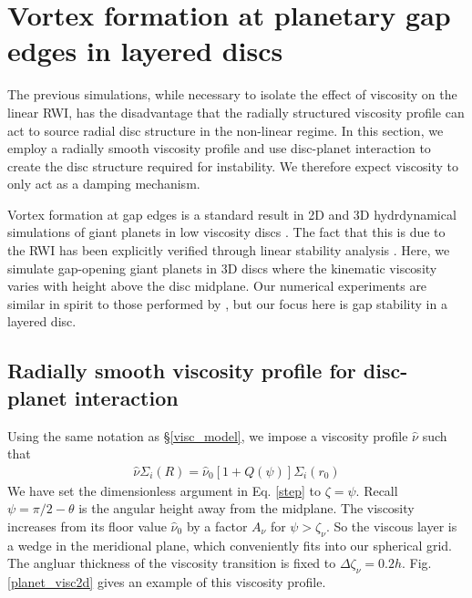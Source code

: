 \section{Vortex formation at planetary gap edges in layered
  discs}\label{disc-planet} 
The previous simulations, while necessary to isolate the effect of 
viscosity on the linear RWI, has the disadvantage that the radially
structured viscosity profile can act to source radial disc structure
in the non-linear regime. In this section, we employ a radially smooth
viscosity profile and use 
disc-planet interaction to
create the disc structure required for instability. We therefore expect viscosity to only
act as a damping mechanism. 

Vortex formation at gap edges is a standard result in 
2D and 3D hydrdynamical simulations of giant planets in low viscosity discs 
\citep{valborro07,lin10,lin11a,lin12}. The fact that this is due to
the RWI has been explicitly verified through linear stability
analysis %
\citep{valborro07,lin10}. Here, we simulate gap-opening giant planets
in 3D discs where the kinematic viscosity varies with height above the
disc midplane. Our numerical experiments are similar in spirit to
those performed by \cite{pierens10}, but our focus here is gap
stability in a layered disc. 
 
\subsection{Radially smooth viscosity profile for disc-planet
  interaction}\label{planet_visc_mode} 
Using the same notation as \S\ref{visc_model}, we impose a viscosity
profile $\hat{\nu}$ such that 
\begin{align}\label{planet_visc_profile}
  \hat{\nu}\Sigma_i(R)=
  \hat{\nu}_0\left[1+Q(\psi)\right]\Sigma_i(r_0)   
\end{align}
We have set the dimensionless argument in Eq. \ref{step} to
$\zeta=\psi$. Recall $\psi=\pi/2-\theta$ is the angular height away from the midplane. 
The viscosity increases from its floor value $\hat{\nu}_0$ by a factor
$A_\nu$ for $\psi > \zeta_\nu$. So the viscous layer is 
a wedge in the meridional plane, which conveniently fits into our
spherical grid. %
The angluar thickness of the viscosity
transition is fixed to $\Delta\zeta_\nu =
0.2h$. Fig. \ref{planet_visc2d} gives an example of this  
viscosity profile. 

